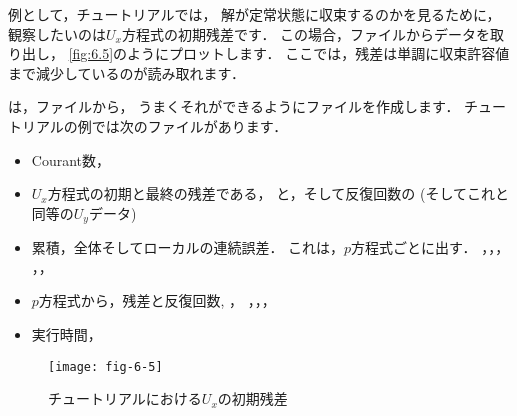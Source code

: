 例として，チュートリアルでは，
解が定常状態に収束するのかを見るために，
観察したいのは$U_{x}$方程式の初期残差です．
この場合，ファイルからデータを取り出し，
\autoref{fig:6.5}のようにプロットします．
ここでは，残差は単調に収束許容値まで減少しているのが読み取れます．

は，ファイルから，
うまくそれができるようにファイルを作成します．
チュートリアルの例では次のファイルがあります．
\begin{itemize}
 \item Courant数，
 \item $U_{x}$方程式の初期と最終の残差である，
       と，そして反復回数の
        (そしてこれと同等の$U_{y}$データ)
 \item 累積，全体そしてローカルの連続誤差．
       これは，$p$方程式ごとに出す．
       ，，，
       ，，
 \item $p$方程式から，残差と反復回数, ，
       ，，，
 \item 実行時間，
\end{itemize}


\begin{figure}[ht]
 \texttt{[image: fig-6-5]}
 \caption{チュートリアルにおける$U_{x}$の初期残差}
 \label{fig:6.5}
\end{figure}
